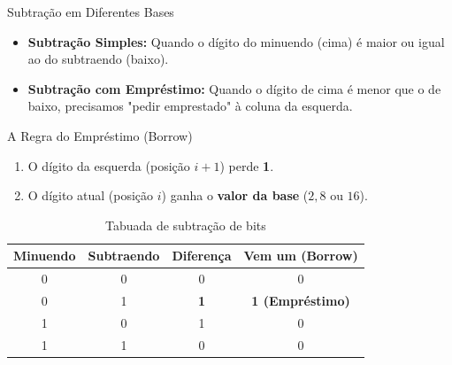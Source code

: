 \begin{frame}{Subtração em Diferentes Bases}
    \begin{itemize}
        \item \textbf{Subtração Simples:} Quando o dígito do minuendo (cima) é maior ou igual ao do subtraendo (baixo).
        \item \textbf{Subtração com Empréstimo:} Quando o dígito de cima é menor que o de baixo, precisamos "pedir emprestado" à coluna da esquerda.
    \end{itemize}

    \begin{block}{A Regra do Empréstimo (Borrow)}
        \begin{enumerate}
            \item O dígito da esquerda (posição $i+1$) perde \textbf{1}.
            \item O dígito atual (posição $i$) ganha o \textbf{valor da base} ($2, 8$ ou $16$).
        \end{enumerate}
    \end{block}

    \begin{table}[h]
        \centering
        \small
        \begin{tabular}{|c|c|c|c|}
            \hline
            \textbf{Minuendo} & \textbf{Subtraendo} & \textbf{Diferença} & \textbf{Vem um (Borrow)} \\ \hline
            0                 & 0                   & 0                  & 0                        \\ \hline
            0                 & 1                   & \textbf{1}         & \textbf{1 (Empréstimo)}  \\ \hline
            1                 & 0                   & 1                  & 0                        \\ \hline
            1                 & 1                   & 0                  & 0                        \\ \hline
        \end{tabular}
        \caption{Tabuada de subtração de bits}
    \end{table}
\end{frame}

